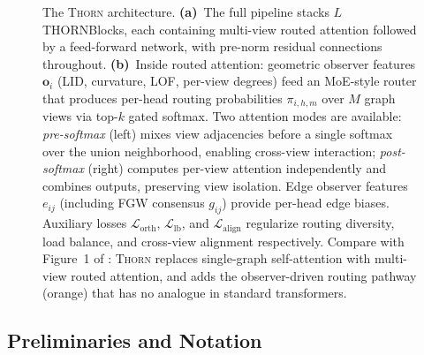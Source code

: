 \documentclass[11pt,a4paper]{article}
\newcommand{\thorn}{\textsc{Thorn}}
\newcommand{\calL}{\mathcal{L}}
\begin{document}
\begin{figure}[t]
\caption{The \thorn{} architecture.
\textbf{(a)}~The full pipeline stacks $L$ THORNBlocks, each containing
multi-view routed attention followed by a feed-forward network, with
pre-norm residual connections throughout.
\textbf{(b)}~Inside routed attention: geometric observer features
$\mathbf{o}_i$ (LID, curvature, LOF, per-view degrees) feed an
MoE-style router that produces per-head routing probabilities
$\pi_{i,h,m}$ over $M$ graph views via top-$k$ gated softmax.
Two attention modes are available:
\emph{pre-softmax} (left) mixes view adjacencies before a single
softmax over the union neighborhood, enabling cross-view interaction;
\emph{post-softmax} (right) computes per-view attention independently
and combines outputs, preserving view isolation.
Edge observer features $e_{ij}$ (including FGW consensus $g_{ij}$)
provide per-head edge biases.
Auxiliary losses $\calL_{\mathrm{orth}}$, $\calL_{\mathrm{lb}}$, and
$\calL_{\mathrm{align}}$ regularize routing diversity, load balance,
and cross-view alignment respectively.
Compare with Figure~1 of \citet{vaswani2017attention}: \thorn{} replaces
single-graph self-attention with multi-view routed attention, and adds
the observer-driven routing pathway (orange) that has no analogue in
standard transformers.}
\label{fig:architecture}
\end{figure}

\subsection{Preliminaries and Notation}
\label{sec:prelim}
\end{document}
